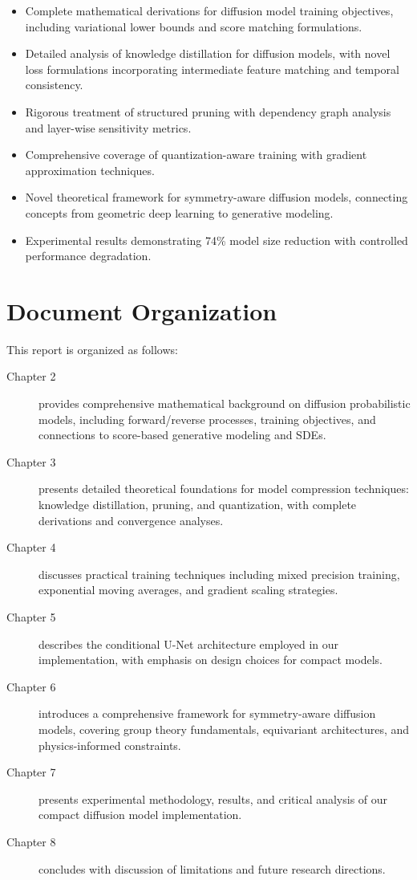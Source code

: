 \documentclass[12pt]{report}
\theoremstyle{definition}
\begin{document}
\begin{itemize}
    \item Complete mathematical derivations for diffusion model training objectives, including variational lower bounds and score matching formulations.
    \item Detailed analysis of knowledge distillation for diffusion models, with novel loss formulations incorporating intermediate feature matching and temporal consistency.
    \item Rigorous treatment of structured pruning with dependency graph analysis and layer-wise sensitivity metrics.
    \item Comprehensive coverage of quantization-aware training with gradient approximation techniques.
    \item Novel theoretical framework for symmetry-aware diffusion models, connecting concepts from geometric deep learning to generative modeling.
    \item Experimental results demonstrating 74\% model size reduction with controlled performance degradation.
\end{itemize}

\section{Document Organization}

This report is organized as follows:

\begin{description}
    \item[Chapter 2] provides comprehensive mathematical background on diffusion probabilistic models, including forward/reverse processes, training objectives, and connections to score-based generative modeling and SDEs.
    
    \item[Chapter 3] presents detailed theoretical foundations for model compression techniques: knowledge distillation, pruning, and quantization, with complete derivations and convergence analyses.
    
    \item[Chapter 4] discusses practical training techniques including mixed precision training, exponential moving averages, and gradient scaling strategies.
    
    \item[Chapter 5] describes the conditional U-Net architecture employed in our implementation, with emphasis on design choices for compact models.
    
    \item[Chapter 6] introduces a comprehensive framework for symmetry-aware diffusion models, covering group theory fundamentals, equivariant architectures, and physics-informed constraints.
    
    \item[Chapter 7] presents experimental methodology, results, and critical analysis of our compact diffusion model implementation.
    
    \item[Chapter 8] concludes with discussion of limitations and future research directions.
\end{description}
\end{document}
